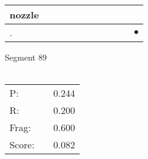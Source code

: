 \documentclass[landscape]{article}
\newcommand{\ssp}{\hspace{2pt}}
\newcommand{\mex}{\cellcolor{g}$\bullet$}
\begin{document}
\begin{tabular}{|l|p{10pt}|p{10pt}|p{10pt}|p{10pt}|p{10pt}|p{10pt}|p{10pt}|p{10pt}|p{10pt}|p{10pt}|}
\hline
\ssp nozzle \ssp&\hspace{2pt}&\hspace{2pt}&\hspace{2pt}&\hspace{2pt}&\hspace{2pt}&\hspace{2pt}&\hspace{2pt}&\hspace{2pt}&\hspace{2pt}&\hspace{2pt}\\
\hline
\ssp \cellcolor{ref9}. \ssp&\hspace{2pt}&\hspace{2pt}&\hspace{2pt}&\hspace{2pt}&\hspace{2pt}&\hspace{2pt}&\hspace{2pt}&\hspace{2pt}&\hspace{2pt}&\hspace{2pt}\mex\\
\hline
\end{tabular}

\vspace{6pt}
\noindent Segment 89\\\\
\noindent\begin{tabular}{lm{12pt}r}
\hline
P:&&0.244\\
R:&&0.200\\
Frag:&&0.600\\
Score:&&0.082\\
\end{tabular}

\newpage
\end{document}
